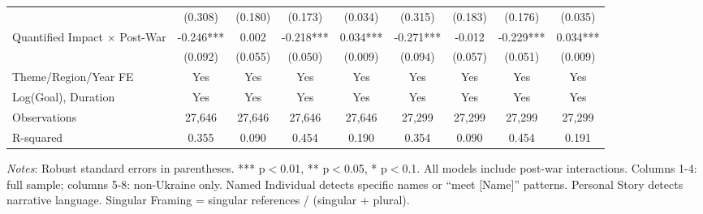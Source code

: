 \begin{table}[htbp]
\begin{threeparttable}
\begin{tabular}{lcccccccc}
& (0.308) & (0.180) & (0.173) & (0.034) & (0.315) & (0.183) & (0.176) & (0.035) \\
Quantified Impact $\times$ Post-War & -0.246*** & 0.002 & -0.218*** & 0.034*** & -0.271*** & -0.012 & -0.229*** & 0.034*** \\
& (0.092) & (0.055) & (0.050) & (0.009) & (0.094) & (0.057) & (0.051) & (0.009) \\
\midrule
Theme/Region/Year FE & Yes & Yes & Yes & Yes & Yes & Yes & Yes & Yes \\
Log(Goal), Duration & Yes & Yes & Yes & Yes & Yes & Yes & Yes & Yes \\
\midrule
Observations & 27,646 & 27,646 & 27,646 & 27,646 & 27,299 & 27,299 & 27,299 & 27,299 \\
R-squared & 0.355 & 0.090 & 0.454 & 0.190 & 0.354 & 0.090 & 0.454 & 0.191 \\
\bottomrule
\end{tabular}
\begin{tablenotes}
\small
\item \textit{Notes}: Robust standard errors in parentheses. *** p$<$0.01, ** p$<$0.05, * p$<$0.1. All models include post-war interactions. Columns 1-4: full sample; columns 5-8: non-Ukraine only. Named Individual detects specific names or ``meet [Name]'' patterns. Personal Story detects narrative language. Singular Framing = singular references / (singular + plural).
\end{tablenotes}
\end{threeparttable}
\end{table}

